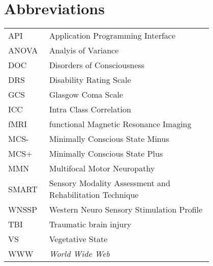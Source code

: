 \chapter*{Abbreviations}


\begin{flushleft}
\begin{tabular}{l p{0.8\linewidth}}

API      & Application Programming Interface\\
ANOVA    & Analyis of Variance \\
DOC      & Disorders of Consciousness\\
DRS      & Disability Rating Scale\\
GCS      & Glasgow Coma Scale\\
ICC      & Intra Class Correlation\\
fMRI     & functional Magnetic Resonance Imaging\\
MCS-     & Minimally Conscious State Minus\\
MCS+     & Minimally Conscious State Plus\\
MMN      & Multifocal Motor Neuropathy \\
SMART    & Sensory Modality Assessment and
Rehabilitation Technique\\
WNSSP    & Western Neuro Sensory Stimulation Profile\\
TBI      & Traumatic brain injury\\
VS       & Vegetative State\\

WWW      & \emph{World Wide Web}
\end{tabular}
\end{flushleft}

